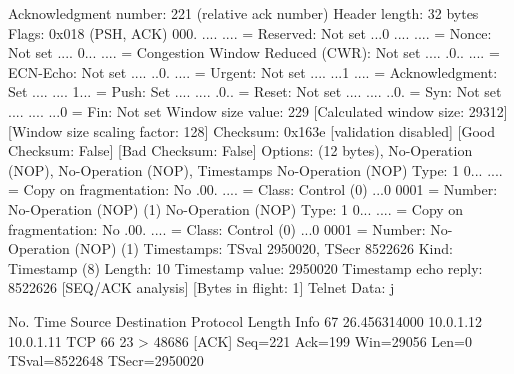     Acknowledgment number: 221    (relative ack number)
    Header length: 32 bytes
    Flags: 0x018 (PSH, ACK)
        000. .... .... = Reserved: Not set
        ...0 .... .... = Nonce: Not set
        .... 0... .... = Congestion Window Reduced (CWR): Not set
        .... .0.. .... = ECN-Echo: Not set
        .... ..0. .... = Urgent: Not set
        .... ...1 .... = Acknowledgment: Set
        .... .... 1... = Push: Set
        .... .... .0.. = Reset: Not set
        .... .... ..0. = Syn: Not set
        .... .... ...0 = Fin: Not set
    Window size value: 229
    [Calculated window size: 29312]
    [Window size scaling factor: 128]
    Checksum: 0x163e [validation disabled]
        [Good Checksum: False]
        [Bad Checksum: False]
    Options: (12 bytes), No-Operation (NOP), No-Operation (NOP), Timestamps
        No-Operation (NOP)
            Type: 1
                0... .... = Copy on fragmentation: No
                .00. .... = Class: Control (0)
                ...0 0001 = Number: No-Operation (NOP) (1)
        No-Operation (NOP)
            Type: 1
                0... .... = Copy on fragmentation: No
                .00. .... = Class: Control (0)
                ...0 0001 = Number: No-Operation (NOP) (1)
        Timestamps: TSval 2950020, TSecr 8522626
            Kind: Timestamp (8)
            Length: 10
            Timestamp value: 2950020
            Timestamp echo reply: 8522626
    [SEQ/ACK analysis]
        [Bytes in flight: 1]
Telnet
    Data: j

No.     Time           Source                Destination           Protocol Length Info
     67 26.456314000   10.0.1.12             10.0.1.11             TCP      66     23 > 48686 [ACK] Seq=221 Ack=199 Win=29056 Len=0 TSval=8522648 TSecr=2950020

